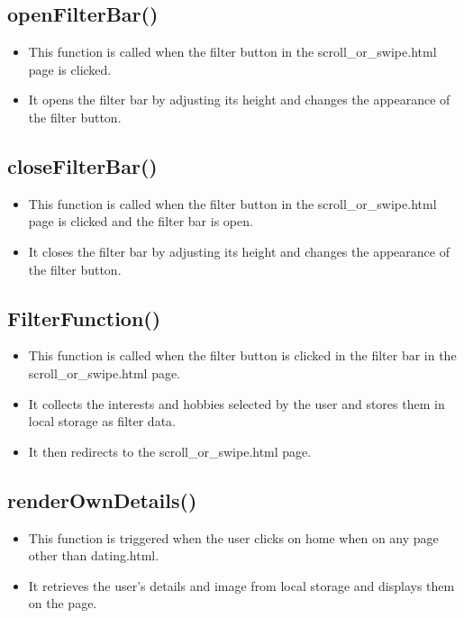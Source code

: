 \documentclass[12pt,a4paper]{article}
\begin{document}
\subsection{openFilterBar()}
\begin{itemize}
    \item This function is called when the filter button in the scroll\_or\_swipe.html page is clicked.
    \item It opens the filter bar by adjusting its height and changes the appearance of the filter button.
\end{itemize}

\subsection{closeFilterBar()}
\begin{itemize}
    \item This function is called when the filter button in the scroll\_or\_swipe.html page is clicked and the filter bar is open.
    \item It closes the filter bar by adjusting its height and changes the appearance of the filter button.
\end{itemize}

\subsection{FilterFunction()}
\begin{itemize}
    \item This function is called when the filter button is clicked in the filter bar in the scroll\_or\_swipe.html page.
    \item It collects the interests and hobbies selected by the user and stores them in local storage as filter data.
    \item It then redirects to the scroll\_or\_swipe.html page.
\end{itemize}

\subsection{renderOwnDetails()}
\begin{itemize}
    \item This function is triggered when the user clicks on home when on any page other than dating.html.
    \item It retrieves the user's details and image from local storage and displays them on the page.
\end{itemize}
\end{document}
